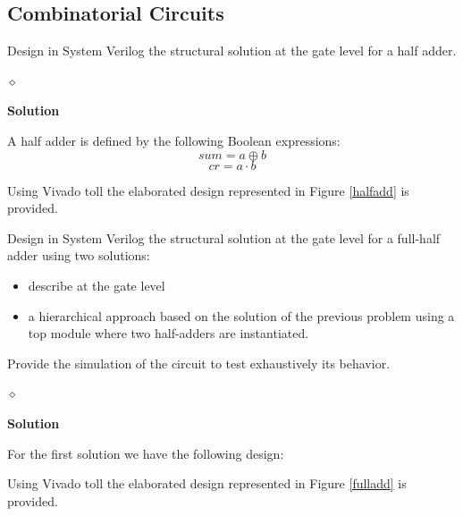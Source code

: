 \subsection{Combinatorial Circuits}

\begin{problem}
Design in System Verilog the structural solution at the gate level for a half adder.

$\diamond$
\end{problem}

{\bf Solution}

A half adder is defined by the following Boolean expressions:
$$sum = a \oplus b$$
$$cr = a \cdot b$$



Using Vivado toll the elaborated design represented in Figure \ref{halfadd} is provided.


\begin{problem}
Design in System Verilog the structural solution at the gate level for a full-half adder using two solutions:
\begin{itemize}
    \item describe at the gate level
    \item a hierarchical approach based on the solution of the previous problem using a top module where two half-adders are instantiated.
\end{itemize}
Provide the simulation of the circuit to test exhaustively its behavior.

$\diamond$
\end{problem}

{\bf Solution}

For the first solution we have the following design:

                    
Using Vivado toll the elaborated design represented in Figure \ref{fulladd} is provided.


